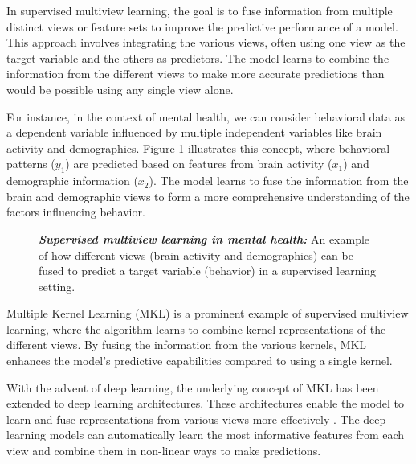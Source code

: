 In supervised multiview learning, the goal is to fuse information from multiple distinct \gls{views} or feature sets to improve the predictive performance of a model. This approach involves integrating the various views, often using one view as the target variable and the others as predictors. The model learns to combine the information from the different \gls{views} to make more accurate predictions than would be possible using any single view alone.

For instance, in the context of mental health, we can consider behavioral data as a dependent variable influenced by multiple independent variables like brain activity and demographics. Figure \ref{fig:mentalhealthsupervised} illustrates this concept, where behavioral patterns ($y_1$) are predicted based on features from brain activity ($x_1$) and demographic information ($x_2$). The model learns to fuse the information from the brain and demographic \gls{views} to form a more comprehensive understanding of the factors influencing behavior.

\begin{figure}
    \centering
        \caption[Supervised multiview learning in mental health]{\textit{\textbf{Supervised multiview learning in mental health:}} An example of how different \gls{views} (brain activity and demographics) can be fused to predict a target variable (behavior) in a supervised learning setting.}\label{fig:mentalhealthsupervised}
\end{figure}

Multiple Kernel Learning (MKL) \citep{gonen2011multiple} is a prominent example of supervised multiview learning, where the algorithm learns to combine kernel \gls{representations} of the different views. By fusing the information from the various kernels, MKL enhances the model's predictive capabilities compared to using a single kernel.

With the advent of deep learning, the underlying concept of MKL has been extended to deep learning architectures. These architectures enable the model to learn and fuse \gls{representations} from various \gls{views} more effectively \citep{guo2019deep}. The deep learning models can automatically learn the most informative features from each view and combine them in non-linear ways to make predictions.

